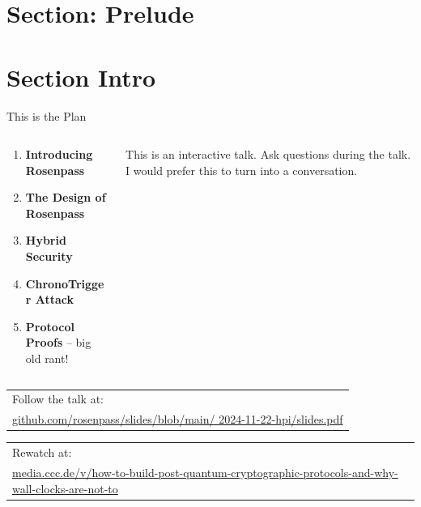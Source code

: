 \section{Section: Prelude}

\section{Section Intro}

\begin{frame}[s]{This is the Plan}
  \small

  \begin{columns}[T]
    \begin{column}{.40\linewidth}
      \begin{enumerate}
        \item \textbf{Introducing Rosenpass}
        \item \textbf{The Design of Rosenpass}
        \item \textbf{Hybrid Security}
        \item \textbf{ChronoTrigger Attack}
        \item \textbf{Protocol Proofs} – big old rant!
      \end{enumerate}
    \end{column}
    \hfill
    \begin{column}{.55\linewidth}
      \centering
      \vspace{2.5em}
      This is an interactive talk. Ask questions during the talk. I would prefer this to turn into a conversation.
    \end{column}
  \end{columns}

	\vfill

    {
      \begin{tabular}[c]{@{\space}l}
      Follow the talk at:\\
      \footnotesize\href{github.com/rosenpass/slides/blob/main/2024-11-22-hpi/slides.pdf}{github.com/rosenpass/slides/blob/main/ 2024-11-22-hpi/slides.pdf}
      \end{tabular}
    }

  \vfill

    \begin{tabular}[c]{@{\space}l}
    Rewatch at:\\
    \tiny\href{media.ccc.de/v/how-to-build-post-quantum-cryptographic-protocols-and-why-wall-clocks-are-not-to}{media.ccc.de/v/how-to-build-post-quantum-cryptographic-protocols-and-why-wall-clocks-are-not-to}
    \end{tabular}

  \vfill
\end{frame}




